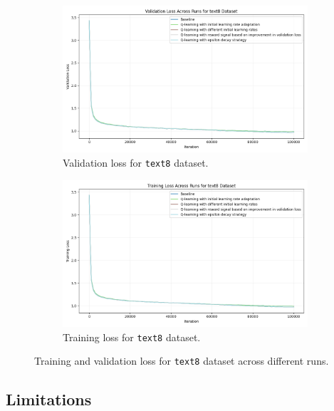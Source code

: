 \documentclass{article} %
\begin{document}
\begin{figure}[h]
    \centering
    \begin{subfigure}{0.49\textwidth}
        \includegraphics[width=\textwidth]{val_loss_text8.png}
        \caption{Validation loss for \texttt{text8} dataset.}
        \label{fig:val_loss_text8}
    \end{subfigure}
    \hfill
    \begin{subfigure}{0.49\textwidth}
        \includegraphics[width=\textwidth]{train_loss_text8.png}
        \caption{Training loss for \texttt{text8} dataset.}
        \label{fig:train_loss_text8}
    \end{subfigure}
    \caption{Training and validation loss for \texttt{text8} dataset across different runs.}
    \label{fig:text8_loss}
\end{figure}

\subsection{Limitations}
\end{document}
